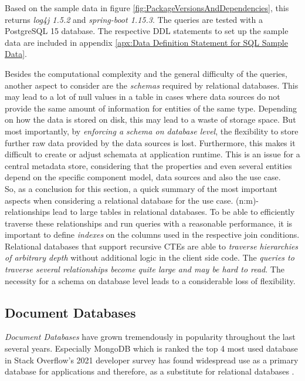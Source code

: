 Based on the sample data in figure \ref{fig:PackageVersionsAndDependencies}, this returns \emph{log4j 1.5.2} and \emph{spring-boot 1.15.3}. The queries are tested with a PostgreSQL 15 database. The respective DDL statements to set up the sample data are included in appendix \ref{apx:Data Definition Statement for SQL Sample Data}.\par
Besides the computational complexity and the general difficulty of the queries, another aspect to consider are the \emph{schemas} required by relational databases. This may lead to a lot of null values in a table in cases where data sources do not provide the same amount of information for entities of the same type. Depending on how the data is stored on disk, this may lead to a waste of storage space. But most importantly, by \emph{enforcing a schema on database level}, the flexibility to store further raw data provided by the data sources is lost. Furthermore, this makes it difficult to create or adjust schemata at application runtime. This is an issue for a central metadata store, considering that the properties and even several entities depend on the specific component model, data sources and also the use case.\\

So, as a conclusion for this section, a quick summary of the most important aspects when considering a relational database for the use case. 
(n:m)-relationships lead to large tables in relational databases. To be able to efficiently traverse these relationships and run queries with a reasonable performance, it is important to define \emph{indexes} on the columns used in the respective join conditions. Relational databases that support recursive CTEs are able to \emph{traverse hierarchies of arbitrary depth} without additional logic in the client side code. The \emph{queries to traverse several relationships become quite large and may be hard to read}. The necessity for a schema on database level leads to a considerable loss of flexibility. 
 
\subsection{Document Databases}
\emph{Document Databases} have grown tremendously in popularity throughout the last several years. Especially MongoDB which is ranked the top 4 most used database in Stack Overflow's 2021 developer survey has found widespread use as a primary database for applications and therefore, as a substitute for relational databases \cite{StackoverflowDeveloperSurvey}.

